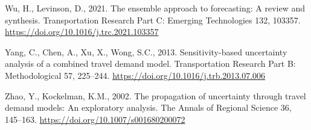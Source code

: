 \documentclass[
  futuretransp,
  submit,
  moreauthors,
]{Definitions/mdpi}
\newlength{\cslhangindent}
\newenvironment{CSLReferences}[2] %
 {\begin{list}{}{%
  \setlength{\itemindent}{0pt}
  \setlength{\leftmargin}{0pt}
  \setlength{\parsep}{0pt}
  \ifodd #1
   \setlength{\leftmargin}{\cslhangindent}
   \setlength{\itemindent}{-1\cslhangindent}
  \fi
  \setlength{\itemsep}{#2\baselineskip}}}
 {\end{list}}
\begin{document}
\begin{CSLReferences}{1}{0}
Wu, H., Levinson, D., 2021. The ensemble approach to forecasting: {A}
review and synthesis. Transportation Research Part C: Emerging
Technologies 132, 103357.
\url{https://doi.org/10.1016/j.trc.2021.103357}

Yang, C., Chen, A., Xu, X., Wong, S.C., 2013. Sensitivity-based
uncertainty analysis of a combined travel demand model. Transportation
Research Part B: Methodological 57, 225--244.
\url{https://doi.org/10.1016/j.trb.2013.07.006}

Zhao, Y., Kockelman, K.M., 2002. The propagation of uncertainty through
travel demand models: {An} exploratory analysis. The Annals of Regional
Science 36, 145--163. \url{https://doi.org/10.1007/s001680200072}

\end{CSLReferences}










\PublishersNote{}
\end{document}
